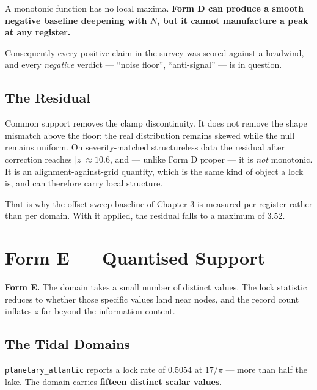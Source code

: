 \documentclass[11pt, letterpaper, openany]{book}
\begin{document}
\begin{signalbox}
A monotonic function has no local maxima. \textbf{Form D can produce a smooth negative baseline
deepening with $N$, but it cannot manufacture a peak at any register.}

\medskip
\noindent Consequently every positive claim in the survey was scored against a headwind, and
every \emph{negative} verdict --- ``noise floor'', ``anti-signal'' --- is in question.
\end{signalbox}

\subsection{The Residual}

Common support removes the clamp discontinuity. It does not remove the shape mismatch above the
floor: the real distribution remains skewed while the null remains uniform. On severity-matched
structureless data the residual after correction reaches $\lvert z\rvert \approx 10.6$, and
--- unlike Form D proper --- it is \emph{not} monotonic. It is an alignment-against-grid
quantity, which is the same kind of object a lock is, and can therefore carry local structure.

That is why the offset-sweep baseline of Chapter 3 is measured per register rather than per
domain. With it applied, the residual falls to a maximum of $3.52$.

\section{Form E --- Quantised Support}

\begin{formbox}
\textbf{Form E.} The domain takes a small number of distinct values. The lock statistic reduces
to whether those specific values land near nodes, and the record count inflates $z$ far beyond
the information content.
\end{formbox}

\subsection{The Tidal Domains}

\texttt{planetary\_atlantic} reports a lock rate of $0.5054$ at $17/\pi$ --- more than half the
lake. The domain carries \textbf{fifteen distinct scalar values}.
\end{document}
